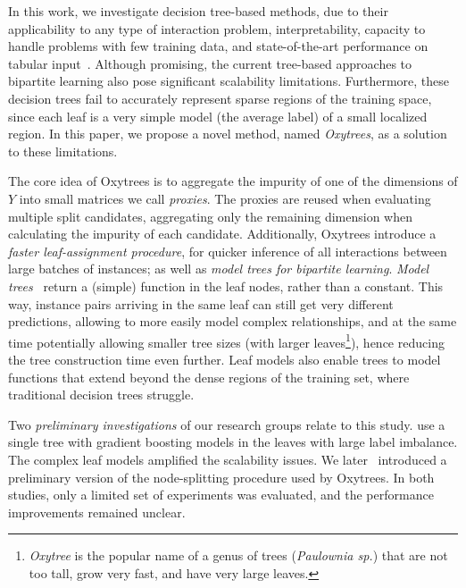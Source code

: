 \documentclass[letterpaper]{article}
\begin{document}
In this work, we investigate decision tree-based methods, due to their applicability to any type of interaction problem,
interpretability, capacity to handle problems with few training data, and state-of-the-art performance on tabular input~\cite{grinsztajn_why_2022,costa2023recent,blockeel2023decision}. Although promising, the current tree-based approaches to bipartite learning also pose significant scalability limitations. Furthermore, these decision trees fail to accurately represent sparse regions of the training space, since each leaf is a very simple model (the average label) of a small localized region.
In this paper, we propose a novel method, named \emph{Oxytrees}, as a solution to these limitations.


The core idea of Oxytrees is to aggregate the impurity of one of the dimensions of $Y$ into small matrices we call \textit{proxies}. The proxies are reused when evaluating multiple split candidates, aggregating only the remaining dimension when calculating the impurity of each candidate.
Additionally, Oxytrees introduce 
a \emph{faster leaf-assignment procedure}, for quicker inference of all interactions between large batches of instances; as well as
\emph{model trees for bipartite learning}.
\emph{Model trees}~\cite{quinlan1992learning,landwehr_logistic_2005,costa2023recent} return a (simple) function in the leaf nodes, rather than a constant.
This way, instance pairs arriving in the same leaf can still get very different predictions, allowing to more easily model complex relationships, and at the same time potentially allowing smaller tree sizes (with larger leaves\footnote{\textit{Oxytree} is the popular name of a genus of trees (\textit{Paulownia sp.}) that are not too tall, grow very fast, and have very large leaves.}), hence reducing the tree construction time even further.
Leaf models also enable trees to model functions that extend beyond the dense regions of the training set, where traditional decision trees struggle.

Two \emph{preliminary investigations} of our research groups relate to this study. \citet{alves2022twostep} use a single tree with gradient boosting models in the leaves with large label imbalance. The complex leaf models amplified the scalability issues.
We later~\cite{ilidio_fast_2024} introduced a preliminary version of the node-splitting procedure used by Oxytrees. In both studies, only a limited set of experiments was evaluated, and the performance improvements remained unclear.
\end{document}
